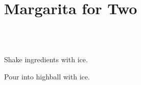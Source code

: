 \section[Margarita for Two]{Margarita for Two~\vegan}


\begin{recipestats}[
	servings=2,
	preptime=5 \minute,
	source=\citefield{joyofcooking2006}{title}\cite{joyofcooking2006},
]
\end{recipestats}


\begin{ingredientcolumns}[1]
	\begin{ingredientblock}
		\\
		\\
	\end{ingredientblock}
\end{ingredientcolumns}


\begin{preparation}
\item Shake ingredients with ice.

\item Pour into highball with ice.
\end{preparation}


\recipeend
